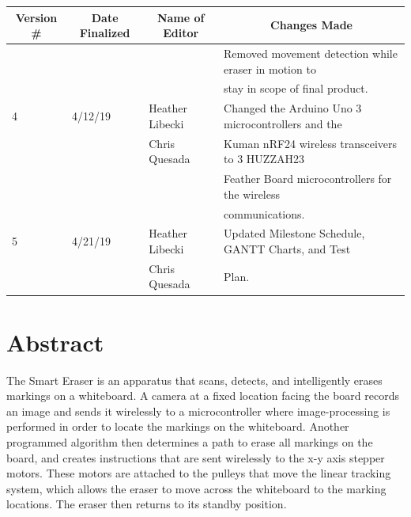 \begin{table} [H]	
	\normalsize
	\centering
	\begin{tabular}{|l|l|l|l|}
		\hline
		\multicolumn{1}{|c|}{\textbf{Version \#}} & 
		\multicolumn{1}{|c|}{\textbf{Date Finalized}} &
		\multicolumn{1}{|c|}{\textbf{Name of Editor}} & 
		\multicolumn{1}{|c|}{\textbf{Changes Made}} \\
		\hline
 	    &          		 &                			   & Removed movement detection while eraser in motion to \\
 	    &          		 &                			   & stay in scope of final product.\\
 	      \hline
	 4 & 4/12/19  	 & Heather Libecki 		   & Changed the Arduino Uno 3 microcontrollers and the \\ 
	    &          		 & Chris Quesada   		   & Kuman nRF24 wireless transceivers to 3 HUZZAH23 \\
	    &        		 &                 			   & Feather Board microcontrollers for the wireless \\ 	
	    &         		 &                			   & communications.	\\      
 	      \hline
 	 5 & 4/21/19  	 & Heather Libecki		   & Updated Milestone Schedule, GANTT Charts, and Test\\ 
 	    &         		 & Chris Quesada  		   & Plan.	\\ 	
	      
		\hline
	\end{tabular} 
\end{table}
 \newpage
 \thispagestyle{empty}
 \section*{Abstract}

The Smart Eraser is an apparatus that scans, detects, and intelligently erases markings on a whiteboard. A camera at a fixed location facing the board records an image and sends it wirelessly to a microcontroller where image-processing is performed in order to locate the markings on the whiteboard. Another programmed algorithm then determines a path to erase all markings on the board, and creates instructions that are sent wirelessly to the x-y axis stepper motors. These motors are attached to the pulleys that move the linear tracking system, which allows the eraser to move across the whiteboard to the marking locations. The eraser then returns to its standby position.

 \newpage
 \thispagestyle{empty}
 \tableofcontents
 \listoffigures
 \thispagestyle{empty}
 \listoftables
 
